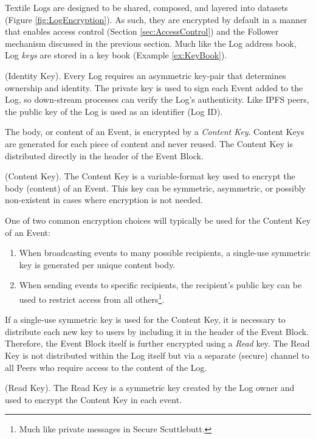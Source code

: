 \documentclass{textile}
\begin{document}
Textile Logs are designed to be shared, composed, and layered into datasets (Figure \ref{fig:LogEncryption}). As such, they are encrypted by default in a manner that enables access control (Section \ref{sec:AccessControl}) and the Follower mechanism discussed in the previous section. Much like the Log address book, Log \emph{keys} are stored in a key book (Example \ref{ex:KeyBook}).

\begin{definition}
(Identity Key). Every Log requires an asymmetric key-pair that determines ownership and identity. The private key is used to sign each Event added to the Log, so down-stream processes can verify the Log's authenticity. Like IPFS peers, the public key of the Log is used as an identifier (Log ID).
\end{definition}

The body, or content of an Event, is encrypted by a \emph{Content Key}. Content Keys are generated for each piece of content and never reused. The Content Key is distributed directly in the header of the Event Block.

\begin{definition}
  (Content Key). The Content Key is a variable-format key used to encrypt the body (content) of an Event. This key can be symmetric, asymmetric, or possibly non-existent in cases where encryption is not needed.
\end{definition}

One of two common encryption choices will typically be used for the Content Key of an Event:
  \begin{enumerate}
    \item When broadcasting events to many possible recipients, a single-use symmetric key is generated per unique content body.
    \item When sending events to specific recipients, the recipient's public key can be used to restrict access from all others\footnote{Much like private messages in Secure Scuttlebutt.}.
  \end{enumerate}

If a single-use symmetric key is used for the Content Key, it is necessary to distribute each new key to users by including it in the header of the Event Block. Therefore, the Event Block itself is further encrypted using a \emph{Read} key. The Read Key is not distributed within the Log itself but via a separate (secure) channel to all Peers who require access to the content of the Log. 

\begin{definition}
 (Read Key). The Read Key is a symmetric key created by the Log owner and used to encrypt the Content Key in each event.
\end{definition}
\end{document}
